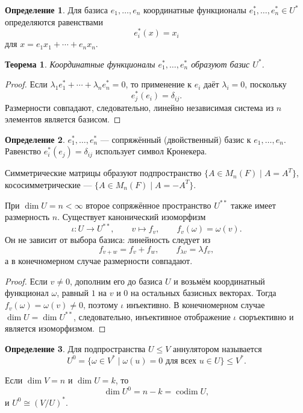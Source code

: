 \documentclass[12pt,a4paper,oneside,openany]{book}
\theoremstyle{definition}
\newtheorem{definition}{Определение}[chapter]
\theoremstyle{plain}
\newtheorem{theorem}{Теорема}[chapter]
\theoremstyle{remark}
\begin{document}
\begin{definition}
Для базиса $e_1,\ldots,e_n$ координатные функционалы
$e_1^*,\ldots,e_n^*\in U^*$ определяются равенствами
\[
  e_i^*(x)=x_i
\]
для $x=e_1x_1+\cdots+e_nx_n$.
\end{definition}

\begin{theorem}
Координатные функционалы $e_1^*,\ldots,e_n^*$ образуют базис $U^*$.
\end{theorem}

\begin{proof}
Если $\lambda_1e_1^*+\cdots+\lambda_ne_n^*=0$, то применение к $e_i$
даёт $\lambda_i=0$, поскольку
\[
  e_j^*(e_i)=\delta_{ij}.
\]
Размерности совпадают, следовательно, линейно независимая система из $n$
элементов является базисом.
\end{proof}

\begin{definition}
$e_1^*,\ldots,e_n^*$ --- сопряжённый (двойственный) базис к
$e_1,\ldots,e_n$. Равенство $e_i^*(e_j)=\delta_{ij}$ использует символ
Кронекера.
\end{definition}

Симметрические матрицы образуют подпространство
$\{A\in M_n(F)\mid A=A^T\}$, кососимметрические ---
$\{A\in M_n(F)\mid A=-A^T\}$.


При $\dim U=n<\infty$ второе сопряжённое пространство $U^{**}$ также
имеет размерность $n$. Существует канонический изоморфизм
\[
  \iota\colon U\to U^{**},
  \qquad
  v\mapsto f_v,
  \qquad
  f_v(\omega)=\omega(v).
\]
Он не зависит от выбора базиса: линейность следует из
\[
  f_{v+w}=f_v+f_w,
  \qquad f_{\lambda v}=\lambda f_v,
\]
а в конечномерном случае размерности совпадают.

\begin{proof}
Если $v\ne0$, дополним его до базиса $U$ и возьмём координатный
функционал $\omega$, равный $1$ на $v$ и $0$ на остальных базисных
векторах. Тогда $f_v(\omega)=\omega(v)\ne0$, поэтому $\iota$ инъективно.
В конечномерном случае
$\dim U=\dim U^{**}$, следовательно, инъективное отображение $\iota$
сюръективно и является изоморфизмом.
\end{proof}

\begin{definition}
Для подпространства $U\leq V$ аннулятором называется
\[
  U^0=\{\omega\in V^*\mid \omega(u)=0\text{ для всех }u\in U\}
  \leq V^*.
\]
\end{definition}

Если $\dim V=n$ и $\dim U=k$, то
\[
  \dim U^0=n-k=\operatorname{codim}U,
\]
и $U^0\cong(V/U)^*$.
\end{document}
